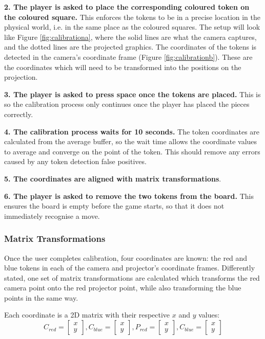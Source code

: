 \documentclass[12pt]{article}
\begin{document}
\textbf{2. The player is asked to place the corresponding coloured token on the coloured square.} 
This enforces the tokens to be in a precise location in the physical world, i.e. in the same place as the coloured squares. 
The setup will look like Figure \ref{fig:calibrationa}, where the solid lines are what the camera captures, and the dotted lines are the projected graphics. 
The coordinates of the tokens is detected in the camera's coordinate frame (Figure \ref{fig:calibrationb}). 
These are the coordinates which will need to be transformed into the positions on the projection.

\textbf{3. The player is asked to press space once the tokens are placed.} 
This is so the calibration process only continues once the player has placed the pieces correctly.

\textbf{4. The calibration process waits for 10 seconds.} 
The token coordinates are calculated from the average buffer, so the wait time allows the coordinate values to average and converge on the point of the token. 
This should remove any errors caused by any token detection false positives. 

\textbf{5. The coordinates are aligned with matrix transformations}. 

\textbf{6. The player is asked to remove the two tokens from the board.} 
This ensures the board is empty before the game starts, so that it does not immediately recognise a move.

\subsubsection{Matrix Transformations}
Once the user completes calibration, four coordinates are known: the red and blue tokens in each of the camera and projector's coordinate frames. 
Differently stated, one set of matrix transformations are calculated which transforms the red camera point onto the red projector point, while also transforming the blue points in the same way. 

Each coordinate is a 2D matrix with their respective $x$ and $y$ values:
\[
C_{red}=
\begin{bmatrix}
x \\ 
y
\end{bmatrix},
C_{blue}=
\begin{bmatrix}
x \\ 
y
\end{bmatrix},
P_{red}=
\begin{bmatrix}
x \\ 
y
\end{bmatrix},
C_{blue}=
\begin{bmatrix}
x \\ 
y
\end{bmatrix}
\]
\end{document}

